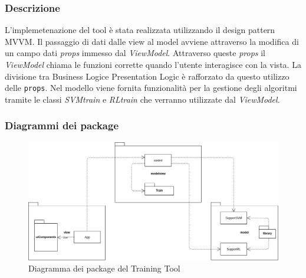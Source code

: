 \subsubsection{Descrizione}
L'implemetenazione del tool è stata realizzata utilizzando il design pattern MVVM.
Il passaggio di dati dalle view al model avviene attraverso la modifica di un campo dati \textit{props} immesso dal \textit{ViewModel}.
Attraverso queste \textit{props} il \textit{ViewModel} chiama le funzioni corrette quando l’utente interagisce con la vista.
La divisione tra Business Logic\glo e Presentation Logic è rafforzato da questo utilizzo delle \texttt{props}.
Nel modello viene fornita funzionalità per la gestione degli algoritmi tramite le classi \textit{SVMtrain} e \textit{RLtrain} che verranno utilizzate dal \textit{ViewModel}.

\subsubsection{Diagrammi dei package}
\begin{figure}[H]
\centering
\includegraphics[scale=0.45]{../../Diagrams/Package_diagrams/tool_design_patern.png}
\caption{Diagramma dei package del Training Tool}
\end{figure}


